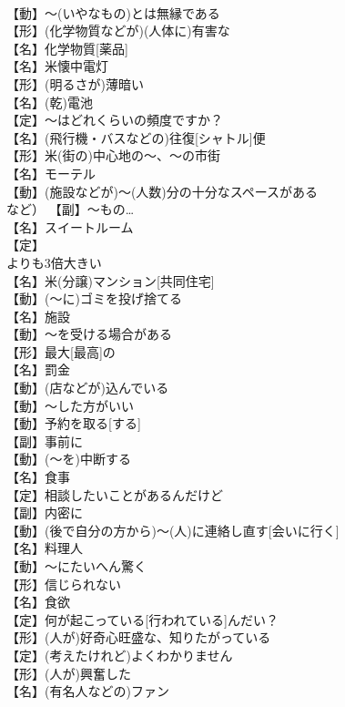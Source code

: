 \documentclass[8pt]{extreport}
\begin{document}
\begin{CJK}{UTF8}{min}
\\	【動】～(いやなもの)とは無縁である
\\	【形】(化学物質などが)(人体に)有害な
\\	【名】化学物質[薬品]
\\	【名】{米}懐中電灯
\\	【形】(明るさが)薄暗い
\\	【名】(乾)電池
\\	【定】～はどれくらいの頻度ですか？
\\	【名】(飛行機・バスなどの)往復[シャトル]便
\\	【形】{米}(街の)中心地の～、～の市街
\\	【名】モーテル
\\	【動】(施設などが)～(人数)分の十分なスペースがある
\\	など）	【副】～もの…
\\	【名】スイートルーム
\\	【定】
\\	よりも3倍大きい
\\	【名】{米}(分譲)マンション[共同住宅]
\\	【動】(～に)ゴミを投げ捨てる
\\	【名】施設
\\	【動】～を受ける場合がある
\\	【形】最大[最高]の
\\	【名】罰金
\\	【動】(店などが)込んでいる
\\	【動】～した方がいい
\\	【動】予約を取る[する]
\\	【副】事前に
\\	【動】(～を)中断する
\\	【名】食事
\\	【定】相談したいことがあるんだけど
\\	【副】内密に
\\	【動】(後で自分の方から)～(人)に連絡し直す[会いに行く]
\\	【名】料理人
\\	【動】～にたいへん驚く
\\	【形】信じられない
\\	【名】食欲
\\	【定】何が起こっている[行われている]んだい？
\\	【形】(人が)好奇心旺盛な、知りたがっている
\\	【定】(考えたけれど)よくわかりません
\\	【形】(人が)興奮した
\\	【名】(有名人などの)ファン

\end{CJK}
\end{document}
